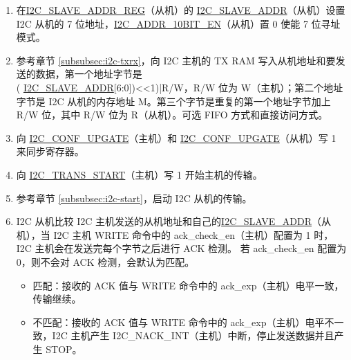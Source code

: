 \documentclass[main\_\_CN.tex]{subfiles}
\begin{document}
\begin{enumerate}
\item 在\hyperref[regdesc:I2CSLAVEADDRREG]{I2C\_SLAVE\_ADDR\_REG}（从机）的 \hyperref[fielddesc:I2CSLAVEADDR]{I2C\_SLAVE\_ADDR}（从机）设置 I2C 从机的 7 位地址，\hyperref[fielddesc:I2CADDR10BITEN]{I2C\_ADDR\_10BIT\_EN}（从机）置 0 使能 7 位寻址模式。
\item 参考章节 \ref{subsubsec:i2c-txrx}，向 I2C 主机的 TX RAM 写入从机地址和要发送的数据，第一个地址字节是 \\( \hyperref[fielddesc:I2CSLAVEADDR]{I2C\_SLAVE\_ADDR}[6:0])<<1)|R/W，R/W 位为 W（主机）；第二个地址字节是 I2C 从机的内存地址 M。第三个字节是重复的第一个地址字节加上 R/W 位，其中 R/W 位为 R（从机）。可选 FIFO 方式和直接访问方式。
\item 向 \hyperref[fielddesc:I2CCONFUPGATE]{I2C\_CONF\_UPGATE}（主机）和 \hyperref[fielddesc:I2CCONFUPGATE]{I2C\_CONF\_UPGATE}（从机）写 1 来同步寄存器。
\item 向 \hyperref[fielddesc:I2CTRANSSTART]{I2C\_TRANS\_START}（主机）写 1 开始主机的传输。
\item 参考章节 \ref{subsubsec:i2c-start}，启动 I2C 从机的传输。
\item I2C 从机比较 I2C 主机发送的从机地址和自己的\hyperref[fielddesc:I2CSLAVEADDR]{I2C\_SLAVE\_ADDR}（从机），当 I2C 主机 WRITE 命令中的 ack\_check\_en（主机）配置为 1 时，I2C 主机会在发送完每个字节之后进行 ACK 检测。 若 ack\_check\_en 配置为 0，则不会对 ACK 检测，会默认为匹配。

\begin{itemize}
\item 匹配：接收的 ACK 值与 WRITE 命令中的 ack\_exp（主机）电平一致，传输继续。
\item 不匹配：接收的 ACK 值与 WRITE 命令中的 ack\_exp（主机）电平不一致，I2C 主机产生 I2C\_NACK\_INT（主机）中断，停止发送数据并且产生 STOP。
\end{itemize}


\end{enumerate}
\end{document}
